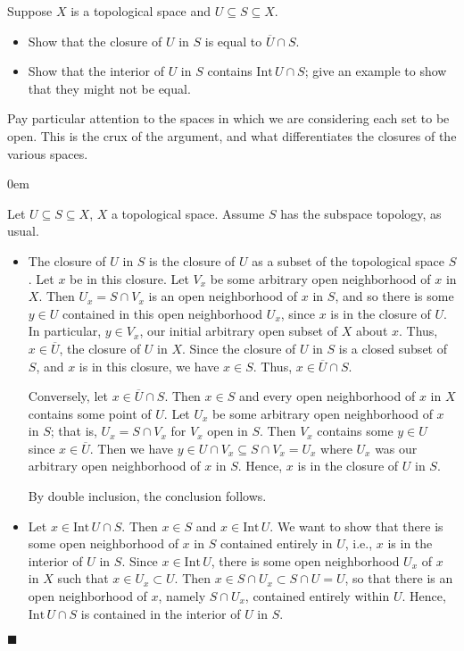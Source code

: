 \documentclass[12pt]{article}
\renewcommand{\qed}{\hfill$\blacksquare$}
\renewenvironment{proof}{\begin{addmargin}[1em]{0em}\begin{newproof}}{\end{newproof}\end{addmargin}\qed}
\newenvironment{exercise}[2][Exercise]{\begin{trivlist}
\item[\hskip \labelsep {\bfseries #1}\hskip \labelsep {\bfseries #2.}]}{\end{trivlist}}
\begin{document}
\begin{exercise}{3.7}
Suppose $X$ is a topological space and $U\subseteq S \subseteq X$.
\begin{itemize}
	\item Show that the closure of $U$ in $S$ is equal to $\overline{U}\cap S$.
	\item Show that the interior of $U$ in $S$ contains $\text{Int}\, U \cap S$; give an example to show that they might not be equal.
\end{itemize}
\end{exercise}
{\color{red} Pay particular attention to the spaces in which we are considering each set to be open. This is the crux of the argument, and what differentiates the closures of the various spaces. }\\
\begin{proof}
Let $U\subseteq S \subseteq X$, $X$ a topological space. {\color{red} Assume $S$ has the subspace topology, as usual.}
\begin{itemize}
	\item The closure of $U$ in $S$ is the closure of $U$ as a subset of the topological space $S$. Let $x$ be in this closure. Let $V_x$ be some arbitrary open neighborhood of $x$ in $X$. Then $U_x = S\cap V_x$ is an open neighborhood of $x$ in $S$, and so there is some $y \in U$ contained in this open neighborhood $U_x$, since $x$ is in the closure of $U$. In particular, $y \in V_x$, our initial arbitrary open subset of $X$ about $x$. Thus, $x \in \overline{U}$, the closure of $U$ in $X$. Since the closure of $U$ in $S$ is a closed subset of $S$, and $x$ is in this closure, we have $x\in S$. Thus, $x\in \overline{U}\cap S$.
	
	Conversely, let $x\in \overline{U}\cap S$. Then $x\in S$ and every open neighborhood of $x$ in $X$ contains some point of $U$. Let $U_x$ be some arbitrary open neighborhood of $x$ in $S$; that is, $U_x = S\cap V_x$ for $V_x$ open in $S$. Then $V_x$ contains some $y\in U$ since $x \in \overline{U}$. Then we have $y \in U\cap V_x \subseteq S\cap V_x = U_x$ where $U_x$ was our arbitrary open neighborhood of $x$ in $S$. Hence, $x$ is in the closure of $U$ in $S$.
	
	By double inclusion, the conclusion follows.
	
	\item Let $x \in \text{Int}\, U\cap S$. Then $x\in S$ and $x\in \text{Int}\, U$.  We want to show that there is some open neighborhood of $x$ in $S$ contained entirely in $U$, i.e., $x$ is in the interior of $U$ in $S$. Since $x \in \text{Int}\, U$, there is some open neighborhood $U_x$ of $x$ in $X$ such that $x\in U_x \subset U$. Then $x \in S\cap U_x \subset S\cap U = U $, so that there is an open neighborhood of $x$, namely $S\cap U_x$, contained entirely within $U$. Hence, $\text{Int}\, U \cap S$ is contained in the interior of $U$ in $S$. 
	

\end{itemize}
\end{proof}
\end{document}
